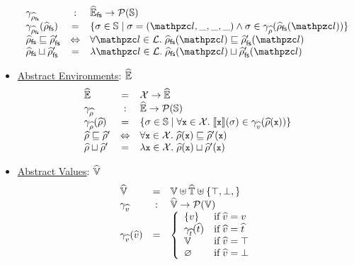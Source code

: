 \begin{itemize}
\[\begin{array}{lcl}
        \afsenvgamma &:& \afsenvset \rightarrow \powerset{\stset}\\

        \afsenvgamma(\afsenv) &=& \{ \st \in \stset \mid
          \st = (\lab, \_, \_, \_) \wedge \st \in \aenvgamma(\afsenv(\lab))
        \}\\

        \afsenv \order \afsenv' &\Leftrightarrow&
        \forall \lab \in \labset. \; \afsenv(\lab) \order \afsenv'(\lab)\\

        \afsenv \join \afsenv' &=&
        \lambda \lab \in \labset. \; \afsenv(\lab) \join \afsenv'(\lab)\\
      \end{array}
    \]

  \item \underline{Abstract Environments}: $\widehat{\mathbb{E}}$
    \[
      \begin{array}{lcl}
        \widehat{\mathbb{E}} &=& \mathcal{X} \rightarrow \widehat{\mathbb{E}}\\

        \gamma_{\widehat{\rho}} &:& \widehat{\mathbb{E}} \rightarrow \mathcal{P}(\mathbb{S})\\

        \gamma_{\widehat{\rho}}(\widehat{\rho}) &=& \{ \sigma \in \mathbb{S} \mid
          \forall {\small \texttt{x}} \in \mathcal{X}. \;
          \llbracket{{\small \texttt{x}}}\rrbracket(\sigma) \in \gamma_{\widehat{v}}(\widehat{\rho}({\small \texttt{x}}))
        \}\\

        \widehat{\rho} \sqsubseteq \widehat{\rho}' &\Leftrightarrow&
        \forall {\small \texttt{x}} \in \mathcal{X}. \;
        \widehat{\rho}({\small \texttt{x}}) \sqsubseteq \widehat{\rho}'({\small \texttt{x}})\\

        \widehat{\rho} \sqcup \widehat{\rho}' &=&
        \lambda {\small \texttt{x}} \in \mathcal{X}. \;
        \widehat{\rho}({\small \texttt{x}}) \sqcup \widehat{\rho}'({\small \texttt{x}})\\
      \end{array}
    \]

  \item \underline{Abstract Values}: $\widehat{\mathbb{V}}$
    \[
      \begin{array}{lcl}
        \widehat{\mathbb{V}} &=& \mathbb{V} \uplus \widehat{\mathbb{T}} \uplus \{ \top, \bot,  \}\\

        \gamma_{\widehat{v}} &:& \widehat{\mathbb{V}} \rightarrow \mathcal{P}(\mathbb{V})\\

        \gamma_{\widehat{v}}(\widehat{v}) &=& \left\{
          \begin{array}{ll}
            \{ v \} & \text{if} \; \widehat{v} = v\\
            \gamma_{\widehat{t}}(\widehat{t}) & \text{if} \; \widehat{v} = \widehat{t}\\
            \mathbb{V} & \text{if} \; \widehat{v} = \top\\
            \varnothing & \text{if} \; \widehat{v} = \bot\\
          \end{array}
        \right.\\


\end{array}\]
\end{itemize}
